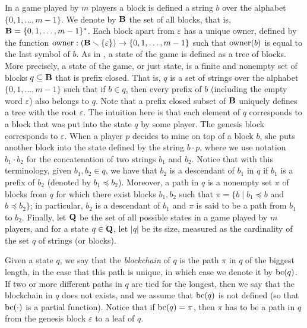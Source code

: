 In a game played by $m$ players a block is defined a string $b$ over the alphabet $\{0,1,\ldots, m-1\}$. We denote by $\mathbf{B}$ the set of all blocks, that is, $\mathbf{B} = \{0,1,\ldots , m-1\}^*$. Each block apart from $\varepsilon$ has a unique owner, defined by the function $\text{\rm owner}: (\mathbf{B} \smallsetminus \{\varepsilon\}) \rightarrow \{0,1, \ldots ,m-1\}$ such that $\text{\rm owner}(b)$ is equal to the last symbol of $b$. As in \cite{mininggames:2016}, a state of the game is defined as a tree of blocks. More precisely, a state of the game, or just state,  is a finite and nonempty set of blocks $q \subseteq \mathbf{B}$ that is prefix closed. That is, $q$ is a set of strings over the alphabet $\{0,1,\ldots, m-1\}$ such that if $b\in q$, then every prefix of $b$ (including the empty word $\varepsilon$) also belongs to $q$. Note that a prefix closed subset of $\mathbf{B}$ uniquely defines a tree with the root $\varepsilon$.
%
The intuition here is that each element of $q$ corresponds to a block that was put into the state $q$ by some player. The genesis block corresponds to $\varepsilon$. When a player $p$ decides to mine on top of a block $b$, she puts another block into the state defined by the string $b\cdot p$, where we use notation $b_1 \cdot b_2$ for the concatenation of two strings $b_1$ and $b_2$.
%
Notice that with this terminology, given $b_1, b_2 \in q$, we have that $b_2$ is a descendant of $b_1$ in $q$ if $b_1$ is a prefix of $b_2$ (denoted by $b_1 \preceq b_2$). Moreover, a path in $q$ is a nonempty set $\pi$ of blocks from $q$ for which there exist blocks $b_1, b_2$ such that $\pi = \{ b \mid b_1 \preceq b$ and $b \preceq b_2\}$; in particular, $b_2$ is a descendant of $b_1$ and $\pi$ is said to be a path from $b_1$ to $b_2$.
Finally, let $\mathbf{Q}$ be the set of all possible states in a game played by $m$ players, and for a state $q \in \mathbf{Q}$, let $|q|$ be its size, measured as the cardinality of the set $q$ of strings (or blocks).

Given a state $q$, we say that the {\em blockchain} of $q$ is the path $\pi$ in $q$ of the biggest length, in the case that this path is unique, in which case we denote it by $\text{bc}(q)$. If two or more different paths in $q$ are tied for the longest, then we say that the blockchain in $q$ does not exists, and we assume that $\text{bc}(q)$ is not defined (so that $\text{bc}(\cdot)$ is a partial function).  Notice that if $\text{bc}(q) = \pi$, then $\pi$ has to be a path in $q$ from the genesis block $\varepsilon$ to a leaf of $q$.

